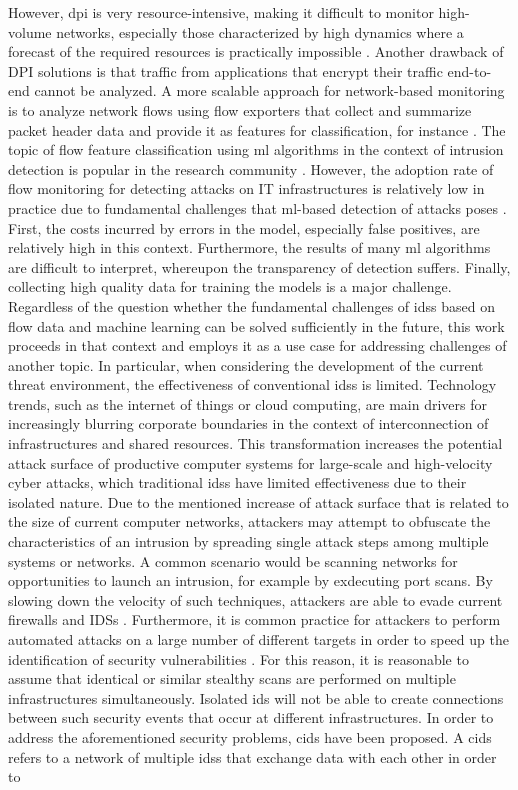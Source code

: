 \documentclass[../../main.tex]{subfiles}
\begin{document}
However, \gls{dpi} is very resource-intensive, making it difficult to monitor high-volume networks, especially those characterized by high dynamics where a forecast of the required resources is practically impossible \cite{dreger2004operational}. Another drawback of DPI solutions is that traffic from applications that encrypt their traffic end-to-end cannot be analyzed. A more scalable approach for network-based monitoring is to analyze network flows using flow exporters that collect and summarize packet header data and provide it as features for classification, for instance \cite{hofstede2018flow} . The topic of flow feature classification using \gls{ml} algorithms in the context of intrusion detection is popular in the research community  \cite{ahmad2021network}. However, the adoption rate of flow monitoring for detecting attacks on IT infrastructures is relatively low in practice due to fundamental challenges that \gls{ml}-based detection of attacks poses \cite{som_2010}. First, the costs incurred by errors in the model, especially false positives, are relatively high in this context. Furthermore, the results of many \gls{ml} algorithms are difficult to interpret, whereupon the transparency of detection suffers. Finally, collecting high quality data for training the models is a major challenge. Regardless of the question whether the fundamental challenges of \glspl{ids} based on flow data and machine learning can be solved sufficiently in the future, this work proceeds in that context and employs it as a use case for addressing challenges of another topic. In particular, when considering the development of the current threat environment, the effectiveness of conventional \glspl{ids} is limited. Technology trends, such as the internet of things or cloud computing, are main drivers for increasingly blurring corporate boundaries in the context of interconnection of infrastructures and shared resources. This transformation increases the potential attack surface of productive computer systems for large-scale and high-velocity cyber attacks, which traditional \glspl{ids} have limited effectiveness due to their isolated nature. Due to the mentioned increase of attack surface that is related to the size of current computer networks, attackers may attempt to obfuscate the characteristics of an intrusion by spreading single attack steps among multiple systems or networks. A common scenario would be scanning networks for opportunities to launch an intrusion, for example by exdecuting port scans. By slowing down the velocity of such techniques, attackers are able to evade current firewalls and IDSs \cite{riquet2012large}. Furthermore, it is common practice for attackers to perform automated attacks on a large number of different targets in order to speed up the identification of security vulnerabilities \cite{savage2005}. For this reason, it is reasonable to assume that identical or similar stealthy scans are performed on multiple infrastructures simultaneously. Isolated \gls{ids} will not be able to create connections between such security events that occur at different infrastructures. In order to address the aforementioned security problems, \gls{cids} have been proposed. A \gls{cids} refers to a network of multiple \glspl{ids} that exchange data with each other in order to 
\end{document}
